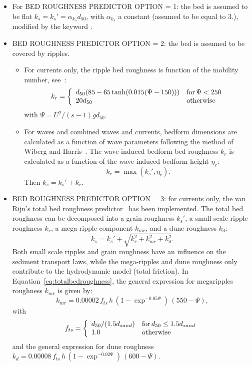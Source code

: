 \begin{itemize}
\item For {\ttfamily BED ROUGHNESS PREDICTOR OPTION = 1}: the bed is assumed to be flat $k_s = k_s'= \alpha_{k_s} d_{50}$, with $\alpha_{k_s}$ a constant (assumed to be equal to $3.$), modified by the keyword .
\item {\ttfamily BED ROUGHNESS PREDICTOR OPTION = 2}: the bed is assumed to be covered by ripples.
  \begin{itemize}
    \item For currents only, the ripple bed roughness is function of the mobility number, see~\cite{vanRijn07}:
\begin{equation*}
k_r =\left\{\begin{array}{ll}
d_{50}(85-65\tanh(0.015(\Psi-150))) & \text{for\,} \Psi<250\\
20 d_{50} & \text{otherwise}
\end{array}
\right.
\end{equation*}
with $\Psi =U^2/(s-1)gd_{50}$.

    \item For waves and combined waves and currents, bedform dimensions are calculated
as a function of wave parameters following the method of Wiberg and Harris~\cite{WibergHarris}.
The wave-induced bedform bed roughness $k_r$ is calculated as a function of the wave-induced bedform
height $\eta_r$:
\begin{equation}
k_r = \max(k_s', \eta_r).
\end{equation}
Then $k_s=k_s'+k_r$.
  \end{itemize}

\item {\ttfamily BED ROUGHNESS PREDICTOR OPTION = 3}: for currents only, the van Rijn's total bed roughness predictor~\cite{vanRijn07, Huybrechts} has been implemented.
The total bed roughness can be decomposed into a grain
roughness $k_s'$, a small-scale ripple roughness $k_r$, a mega-ripple
component $k_{mr}$, and a dune roughness $k_d$:
\begin{equation}\label{eq:totalbedroughness}
k_s = k_s' + \sqrt{k_r^2 + k_{mr}^2 + k_d^2}.
\end{equation}
Both small scale ripples and grain roughness have an influence on the
sediment transport laws, while the mega-ripples and dune roughness only
contribute to the hydrodynamic model (total friction). In Equation~\ref{eq:totalbedroughness}, the general expression for megaripples roughness $k_{mr}$ is given by:
\begin{equation}
k_{mr} = 0.00002\,f_{ts}\,h\,(1-\exp^{-0.05\Psi})\,(550-\Psi),
\end{equation}
with
\begin{equation*}
f_{ts} =\left\{\begin{array}{ll}
d_{50}/(1.5d_{sand}) & \text{for\,} d_{50}\leq 1.5d_{sand}\\
1.0 & \text{otherwise}
\end{array}
\right.
\end{equation*}
and the general expression for dune roughness $k_d=0.00008\,f_{ts}\,h\,(1-\exp^{-0.02\Psi})\,(600-\Psi)$.


\end{itemize}
